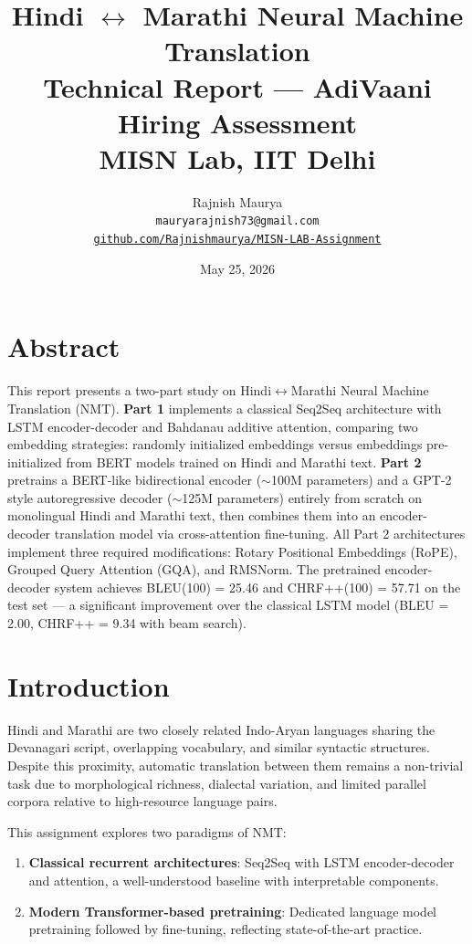 \documentclass[12pt,a4paper]{article}
\title{
    \vspace{-1cm}
    \Large\textbf{Hindi $\leftrightarrow$ Marathi Neural Machine Translation} \\[0.4em]
    \large Technical Report — AdiVaani Hiring Assessment \\[0.2em]
    \normalsize MISN Lab, IIT Delhi
}
\author{
    Rajnish Maurya \\[0.3em]
    \small\texttt{mauryarajnish73@gmail.com} \\[0.2em]
    \small\href{https://github.com/Rajnishmaurya/MISN-LAB-Assignment}{\texttt{github.com/Rajnishmaurya/MISN-LAB-Assignment}}
}
\date{May 25, 2026}
\begin{document}
\maketitle
\tableofcontents
\newpage

\section{Abstract}

This report presents a two-part study on Hindi$\leftrightarrow$Marathi Neural Machine Translation (NMT).
\textbf{Part 1} implements a classical Seq2Seq architecture with LSTM encoder-decoder and Bahdanau additive attention, comparing two embedding strategies: randomly initialized embeddings versus embeddings pre-initialized from BERT models trained on Hindi and Marathi text.
\textbf{Part 2} pretrains a BERT-like bidirectional encoder ($\sim$100M parameters) and a GPT-2 style autoregressive decoder ($\sim$125M parameters) entirely from scratch on monolingual Hindi and Marathi text, then combines them into an encoder-decoder translation model via cross-attention fine-tuning.
All Part 2 architectures implement three required modifications: Rotary Positional Embeddings (RoPE), Grouped Query Attention (GQA), and RMSNorm.
The pretrained encoder-decoder system achieves BLEU(100) = 25.46 and CHRF++(100) = 57.71 on the test set — a significant improvement over the classical LSTM model (BLEU = 2.00, CHRF++ = 9.34 with beam search).

\section{Introduction}

Hindi and Marathi are two closely related Indo-Aryan languages sharing the Devanagari script, overlapping vocabulary, and similar syntactic structures. Despite this proximity, automatic translation between them remains a non-trivial task due to morphological richness, dialectal variation, and limited parallel corpora relative to high-resource language pairs.

This assignment explores two paradigms of NMT:

\begin{enumerate}
    \item \textbf{Classical recurrent architectures}: Seq2Seq with LSTM encoder-decoder and attention, a well-understood baseline with interpretable components.
    \item \textbf{Modern Transformer-based pretraining}: Dedicated language model pretraining followed by fine-tuning, reflecting state-of-the-art practice.
\end{enumerate}
\end{document}
